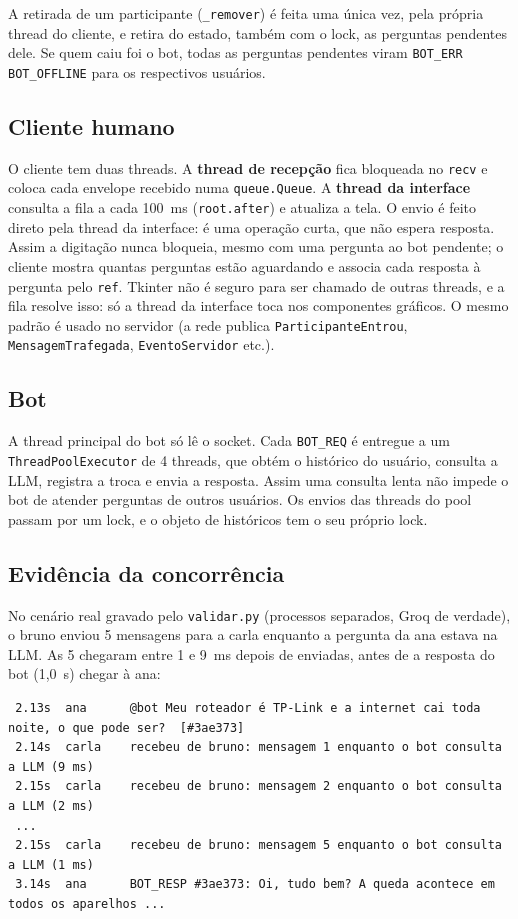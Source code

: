 \documentclass[11pt,a4paper]{article}
\newcommand{\cod}[1]{\texttt{#1}}
\begin{document}
A retirada de um participante (\cod{\_remover}) é feita uma única vez, pela própria thread do
cliente, e retira do estado, também com o lock, as perguntas pendentes dele. Se quem caiu foi o bot,
todas as perguntas pendentes viram \cod{BOT\_ERR BOT\_OFFLINE} para os respectivos usuários.

\subsection{Cliente humano}
O cliente tem duas threads. A \textbf{thread de recepção} fica bloqueada no \cod{recv} e coloca
cada envelope recebido numa \cod{queue.Queue}. A \textbf{thread da interface} consulta a fila a cada
100~ms (\cod{root.after}) e atualiza a tela. O envio é feito direto pela thread da interface: é uma
operação curta, que não espera resposta. Assim a digitação nunca bloqueia, mesmo com uma pergunta ao
bot pendente; o cliente mostra quantas perguntas estão aguardando e associa cada resposta à pergunta
pelo \cod{ref}. Tkinter não é seguro para ser chamado de outras threads, e a fila resolve isso: só a
thread da interface toca nos componentes gráficos. O mesmo padrão é usado no servidor (a rede publica
\cod{ParticipanteEntrou}, \cod{MensagemTrafegada}, \cod{EventoServidor} etc.).

\subsection{Bot}
A thread principal do bot só lê o socket. Cada \cod{BOT\_REQ} é entregue a um
\cod{ThreadPoolExecutor} de 4 threads, que obtém o histórico do usuário, consulta a LLM, registra a
troca e envia a resposta. Assim uma consulta lenta não impede o bot de atender perguntas de outros
usuários. Os envios das threads do pool passam por um lock, e o objeto de históricos tem o seu
próprio lock.

\subsection{Evidência da concorrência}
No cenário real gravado pelo \cod{validar.py} (processos separados, Groq de verdade), o bruno enviou
5 mensagens para a carla enquanto a pergunta da ana estava na LLM. As 5 chegaram entre 1 e 9~ms
depois de enviadas, antes de a resposta do bot (1,0~s) chegar à ana:

\begin{lstlisting}
 2.13s  ana      @bot Meu roteador é TP-Link e a internet cai toda noite, o que pode ser?  [#3ae373]
 2.14s  carla    recebeu de bruno: mensagem 1 enquanto o bot consulta a LLM (9 ms)
 2.15s  carla    recebeu de bruno: mensagem 2 enquanto o bot consulta a LLM (2 ms)
 ...
 2.15s  carla    recebeu de bruno: mensagem 5 enquanto o bot consulta a LLM (1 ms)
 3.14s  ana      BOT_RESP #3ae373: Oi, tudo bem? A queda acontece em todos os aparelhos ...
\end{lstlisting}
\end{document}
